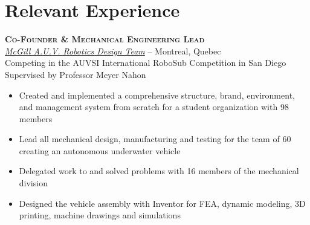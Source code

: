 \documentclass[12pt, letterpaper]{article}
\newcommand{\years}[1]{\marginnote{\footnotesize #1}} %
\begin{document}
\section*{Relevant Experience}

	\begin{samepage}
		\years{8/2013 - 8/2014} \textbf{\scshape Co-Founder \& Mechanical Engineering Lead}\\
		\href {http://www.mcgillrobotics.com}{\textit{McGill A.U.V. Robotics Design Team}} -- Montreal, Quebec\\
		{\small Competing in the AUVSI International RoboSub Competition in San Diego}\\
		{\small Supervised by Professor Meyer Nahon }
		\begin{itemize}
			\item Created and implemented a comprehensive structure, brand, environment, and management system from scratch for a student organization with 98 members
			\item Lead all mechanical design, manufacturing and testing for the team of 60 creating an autonomous underwater vehicle 
			\item Delegated work to and solved problems with 16 members of the mechanical division
			\item Designed the vehicle assembly with Inventor for FEA, dynamic modeling, 3D printing, machine drawings and simulations
		\end{itemize}
	\end{samepage}
\end{document}
